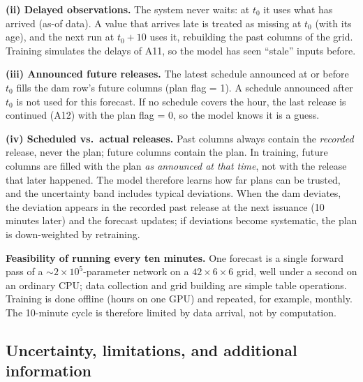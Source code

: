 \textbf{(ii) Delayed observations.} The system never waits: at $t_0$ it uses what has arrived (as-of data). A value that arrives late is treated as missing at $t_0$ (with its age), and the next run at $t_0+10$ uses it, rebuilding the past columns of the grid. Training simulates the delays of A11, so the model has seen ``stale'' inputs before.

\textbf{(iii) Announced future releases.} The latest schedule announced at or before $t_0$ fills the dam row's future columns (plan flag = 1). A schedule announced after $t_0$ is not used for this forecast. If no schedule covers the hour, the last release is continued (A12) with the plan flag = 0, so the model knows it is a guess.

\textbf{(iv) Scheduled vs.\ actual releases.} Past columns always contain the \emph{recorded} release, never the plan; future columns contain the plan. In training, future columns are filled with the plan \emph{as announced at that time}, not with the release that later happened. The model therefore learns how far plans can be trusted, and the uncertainty band includes typical deviations. When the dam deviates, the deviation appears in the recorded past release at the next issuance (10 minutes later) and the forecast updates; if deviations become systematic, the plan is down-weighted by retraining.

\textbf{Feasibility of running every ten minutes.} One forecast is a single forward pass of a $\sim\!2\times10^5$-parameter network on a $42\times6\times6$ grid, well under a second on an ordinary CPU; data collection and grid building are simple table operations. Training is done offline (hours on one GPU) and repeated, for example, monthly. The 10-minute cycle is therefore limited by data arrival, not by computation.

\subsection{Uncertainty, limitations, and additional information}

